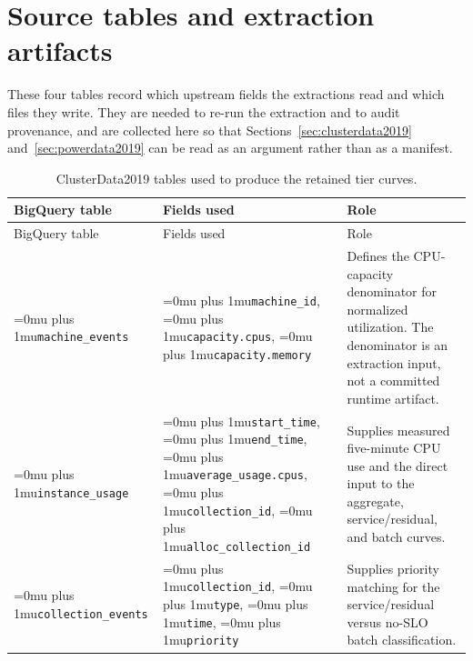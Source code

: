 ﻿\documentclass[12pt]{article}
\newcommand{\codepath}[1]{{\Urlmuskip=0mu plus 1mu\relax\nolinkurl{#1}}}
\begin{document}
\section{Source tables and extraction artifacts}
\label{app:source-tables}

These four tables record which upstream fields the extractions read and which files they write. They are needed to re-run the extraction and to audit provenance, and are collected here so that
Sections~\ref{sec:clusterdata2019} and~\ref{sec:powerdata2019} can be read as an argument rather than as a manifest.

\begin{longtable}{@{}L{0.20\textwidth}L{0.32\textwidth}L{0.40\textwidth}@{}}
  \caption{ClusterData2019 tables used to produce the retained tier curves.}
  \label{tab:clusterdata-upstream-fields}\\
  \toprule
  BigQuery table & Fields used & Role \\
  \midrule
  \endfirsthead
  \toprule
  BigQuery table & Fields used & Role \\
  \midrule
  \endhead
  \codepath{machine_events}
    & \codepath{machine_id}, \codepath{capacity.cpus},
      \codepath{capacity.memory}
    & Defines the CPU-capacity denominator for normalized utilization. The
      denominator is an extraction input, not a committed runtime artifact. \\
  \codepath{instance_usage}
    & \codepath{start_time}, \codepath{end_time},
      \codepath{average_usage.cpus}, \codepath{collection_id},
      \codepath{alloc_collection_id}
    & Supplies measured five-minute CPU use and the direct input to the
      aggregate, service/residual, and batch curves. \\
  \codepath{collection_events}
    & \codepath{collection_id}, \codepath{type}, \codepath{time},
      \codepath{priority}
    & Supplies priority matching for the service/residual versus no-SLO batch
      classification. \\
  \bottomrule
\end{longtable}
\end{document}
